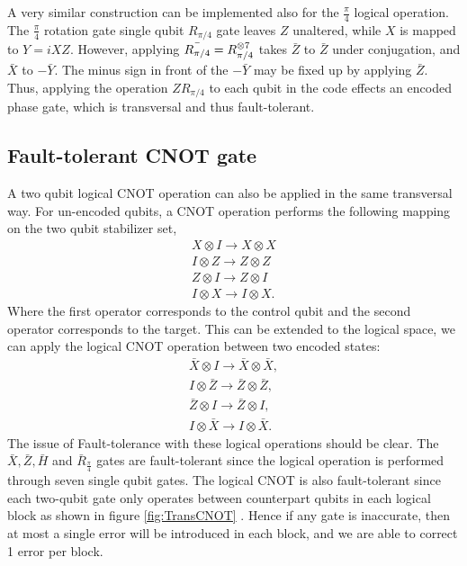 A very similar construction can be implemented also for the $\frac{\pi}{4}$ logical operation.  The $\frac{\pi}{4}$ rotation gate single qubit $R_{\pi/4}$ gate leaves $Z$ unaltered, while $X$ is mapped to $Y=iXZ$. However, applying 
$\Bar{R_{\pi/4}}=R_{\pi/4}^{\otimes7}$ takes $\bar{Z}$ to $\bar{Z}$ under conjugation, and $\bar{X}$ to $-\bar{Y}.$ The minus sign in front of the $-\bar{Y}$ may be fixed up by applying $\bar{Z}$.
Thus, applying the operation $Z R_{\pi/4}$ to each qubit in the code effects an encoded phase gate, which is transversal and thus fault-tolerant.


\subsection*{Fault-tolerant CNOT gate}

A two qubit logical CNOT operation can also be applied in the same transversal way. For un-encoded qubits, a CNOT operation performs the following mapping on the two qubit stabilizer set,
$$
\begin{array}{l}
X \otimes I \rightarrow X \otimes X \\
I \otimes Z \rightarrow Z \otimes Z \\
Z \otimes I \rightarrow Z \otimes I \\
I \otimes X \rightarrow I \otimes X .
\end{array}
$$
Where the first operator corresponds to the control qubit and the second operator corresponds to the target. This can be extended to the logical space, we can apply the logical CNOT operation between two encoded states: 
$$
\begin{array}{l}
\bar{X} \otimes I \rightarrow \bar{X} \otimes \bar{X}, \\
I \otimes \bar{Z} \rightarrow \bar{Z} \otimes \bar{Z}, \\
\bar{Z} \otimes I \rightarrow \bar{Z} \otimes I, \\
I \otimes \bar{X} \rightarrow I \otimes \bar{X} .
\end{array}
$$
The issue of Fault-tolerance with these logical operations should be clear. The $\bar{X}, \bar{Z}, \bar{H}$ and $\bar{R}_{\frac{\pi}{4}}$ gates are fault-tolerant since the logical operation is performed through seven single qubit gates. The logical CNOT is also fault-tolerant since each two-qubit gate only operates between counterpart qubits in each logical block as shown in figure \ref{fig:TransCNOT} . Hence if any gate is inaccurate, then at most a single error will be introduced in each block, and we are able to correct 1 error per block. 
